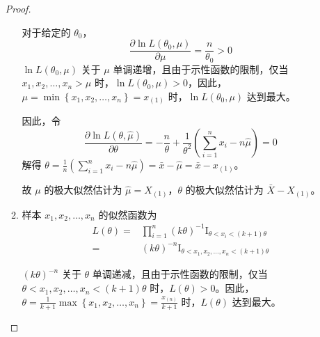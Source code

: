 \documentclass[normal,cn]{elegantnote}
\begin{document}
\begin{enumerate}
\begin{proof}
\begin{enumerate}
                      对于给定的 $\theta_{0}$，
                      \begin{equation*}
                          \frac{\partial\ln L(\theta_{0},\mu)}{\partial\mu}=\frac{n}{\theta_{0}}>0
                      \end{equation*}
                      $\ln L(\theta_{0},\mu)$ 关于 $\mu$ 单调递增，且由于示性函数的限制，仅当 $x_{1},x_{2},\ldots,x_{n}>\mu$ 时，$\ln L(\theta_{0},\mu)>0$，因此，$\mu=\min\left\{x_{1},x_{2},\ldots,x_{n}\right\}=x_{(1)}$ 时，$\ln L(\theta_{0},\mu)$ 达到最大。

                      因此，令
                      \begin{equation*}
                          \frac{\partial\ln L(\theta,\hat{\mu})}{\partial\theta}=-\frac{n}{\theta}+\frac{1}{\theta^{2}}\left(\sum_{i=1}^{n}x_{i}-n\hat{\mu}\right)=0
                      \end{equation*}
                      解得 $\theta=\frac{1}{n}\left(\sum_{i=1}^{n}x_{i}-n\hat{\mu}\right)=\bar{x}-\hat{\mu}=\bar{x}-x_{(1)}$。

                      故 $\mu$ 的极大似然估计为 $\hat{\mu}=X_{(1)}$，$\theta$ 的极大似然估计为 $\bar{X}-X_{(1)}$。
                \item
                      样本 $x_{1},x_{2},\ldots,x_{n}$ 的似然函数为
                      \begin{equation*}
                          \begin{aligned}
                              L(\theta)= & \prod_{i=1}^{n}(k\theta)^{-1}\mathrm{I}_{\theta<x_{i}<(k+1)\theta}     \\
                              =          & (k\theta)^{-n}\mathrm{I}_{\theta<x_{1},x_{2},\ldots,x_{n}<(k+1)\theta}
                          \end{aligned}
                      \end{equation*}

                      $(k\theta)^{-n}$ 关于 $\theta$ 单调递减，且由于示性函数的限制，仅当 $\theta<x_{1},x_{2},\ldots,x_{n}<(k+1)\theta$ 时，$L(\theta)>0$。因此，$\theta=\frac{1}{k+1}\max\left\{x_{1},x_{2},\ldots,x_{n}\right\}=\frac{x_{(n)}}{k+1}$ 时，$L(\theta)$ 达到最大。


\end{enumerate}
\end{proof}
\end{enumerate}
\end{document}
